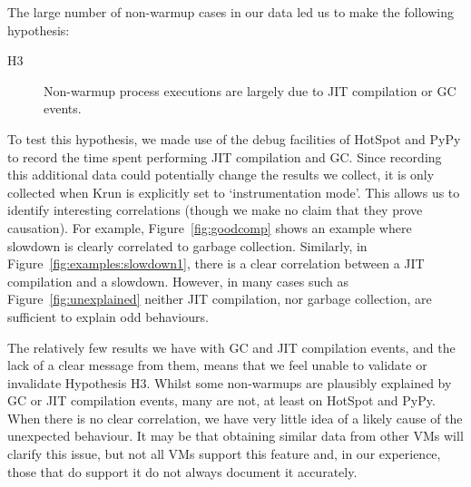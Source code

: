 \documentclass[acmsmall,screen]{acmart}
\newcommand{\krun}{Krun\xspace}
\newcommand{\hypthree}{H3\xspace}
\begin{document}
The large number of non-warmup cases in our data led us to make the following hypothesis:
\begin{description}
  \item[\hypthree] Non-warmup process executions are largely due to JIT compilation or GC events.
\end{description}
To test this hypothesis, we made use of the debug facilities of HotSpot and PyPy to
record the time spent performing JIT compilation and GC. Since
recording this additional data could potentially change the results we collect,
it is only collected when \krun is explicitly set to `instrumentation mode'.
This allows us to identify interesting correlations (though we make no claim
that they prove causation). For example,
Figure~\ref{fig:goodcomp} shows an
example where slowdown is clearly correlated to garbage collection.
Similarly, in Figure~\ref{fig:examples:slowdown1}, there is a clear correlation
between a JIT compilation and a slowdown.
However, in many cases such as Figure~\ref{fig:unexplained} neither JIT
compilation, nor garbage collection, are sufficient to explain odd
behaviours.

The relatively few results we have with GC and JIT compilation events, and the lack of a clear
message from them, means that we feel unable to validate or invalidate
Hypothesis \hypthree. Whilst some non-warmups are plausibly explained by GC or JIT compilation events, many are not, at
least on HotSpot and PyPy. When there is no clear correlation, we have very little idea of
a likely cause of the unexpected behaviour. It may be that obtaining similar data
from other VMs will clarify this issue, but not all VMs support this
feature and, in our experience, those that do support it do not always
document it accurately.
\end{document}
